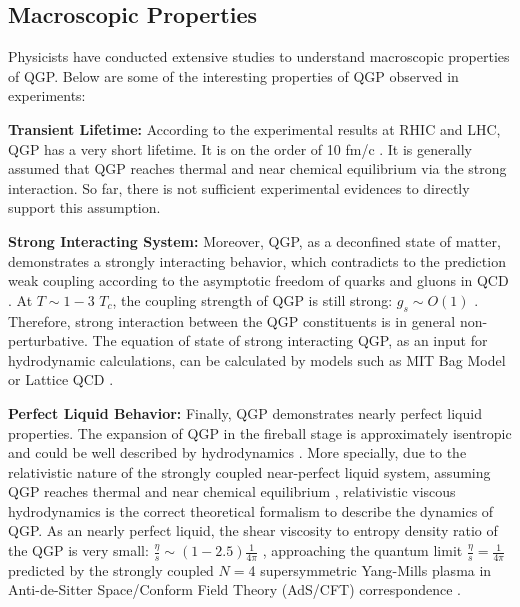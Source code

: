 
\subsection{Macroscopic Properties}

Physicists have conducted extensive studies to understand macroscopic properties of QGP. Below are some of the interesting properties of QGP observed in experiments:

\textbf{Transient Lifetime:} According to the experimental results at RHIC and LHC, QGP has a very short lifetime. It is on the order of 10 fm/c \cite{QGPLifeTime}. It is generally assumed that QGP reaches thermal \cite{QGPThermal} and near chemical equilibrium \cite{QGPChemical} via the strong interaction. So far, there is not sufficient experimental evidences to directly support this assumption.

\textbf{Strong Interacting System:} Moreover, QGP, as a deconfined state of matter, demonstrates a strongly interacting behavior, which contradicts to the prediction weak coupling according to the asymptotic freedom of quarks and gluons in QCD \cite{QCDAsym}. At $T \sim 1 - 3$ $T_c$, the coupling strength of QGP is still strong: $g_s \sim O(1)$ \cite{sQGP}. Therefore, strong interaction between the QGP constituents is in general non-perturbative. The equation of state of strong interacting QGP, as an input for hydrodynamic calculations, can be calculated by models such as MIT Bag Model \cite{MITBag} or Lattice QCD \cite{LatticeEOS}. 

\textbf{Perfect Liquid Behavior:} Finally, QGP demonstrates nearly perfect liquid properties. The expansion of QGP in the fireball stage is approximately isentropic and could be well described by hydrodynamics \cite{Bjorken}. More specially, due to the relativistic nature of the strongly coupled near-perfect liquid system, assuming QGP reaches thermal \cite{QGPThermal} and near chemical equilibrium \cite{QGPChemical}, relativistic viscous hydrodynamics \cite{4DHydro} is the correct theoretical formalism to describe the dynamics of QGP. As an nearly perfect liquid, the shear viscosity to entropy density ratio of the QGP is very small: $\frac{\eta}{s}\sim (1 - 2.5) \frac{1}{4\pi}$ \cite{QGPEtaOverS}, approaching the quantum limit $\frac{\eta}{s} = \frac{1}{4\pi}$ predicted by the strongly coupled $N=$4 supersymmetric Yang-Mills plasma in Anti-de-Sitter Space/Conform Field Theory (AdS/CFT) correspondence \cite{ADSCFT}.

